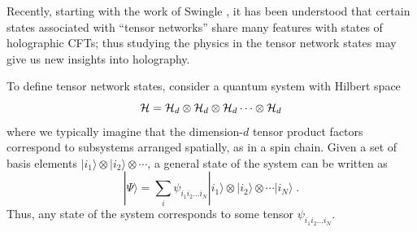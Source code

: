 \documentclass[12pt,epsf]{article}
\newcommand{\be}{\begin{equation}}
\newcommand{\ee}{\end{equation}}
\begin{document}
Recently, starting with the work of Swingle \cite{Swingle:2009bg}, it has been understood that certain states associated with ``tensor networks'' share many features with states of holographic CFTs; thus studying the physics in the tensor network states may give us new insights into holography.

To define tensor network states, consider a quantum system with Hilbert space
\be
{\cal H} = {\cal H}_d \otimes {\cal H}_d \otimes {\cal H}_d \cdots \otimes {\cal H}_d
\ee
where we typically imagine that the dimension-$d$ tensor product factors correspond to subsystems arranged spatially, as in a spin chain. Given a set of basis elements $|i_1 \rangle \otimes |i_2 \rangle \otimes \cdots$, a general state of the system can be written as
\be
|\Psi \rangle = \sum_i \psi_{i_1 i_2 \dots i_N} |i_1 \rangle \otimes |i_2 \rangle \otimes \cdots |i_N \rangle\; .
\ee
Thus, any state of the system corresponds to some tensor $\psi_{i_1 i_2 \dots i_N}$.
\end{document}
